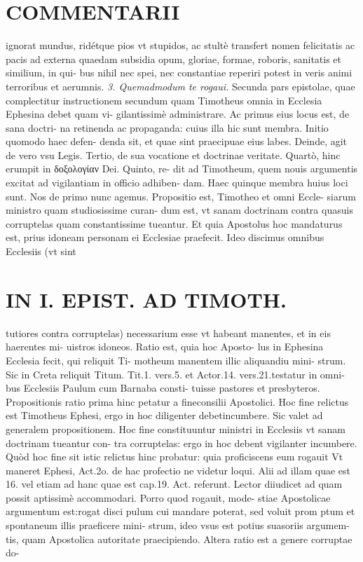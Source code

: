 \documentclass{article}
\begin{document}
\begin{pages}
\section*{COMMENTARII }\pstart ignorat mundus, ridétque pios vt stupidos, ac stultè transfert nomen felicitatis ac pacis ad externa quaedam subsidia opum, gloriae, formae, roboris, sanitatis et similium, in qui- bus nihil nec spei, nec constantiae reperiri potest in veris animi terroribus et aerumnis.  \pend
\textit{3. Quemadmodum te rogaui. }\pstart Secunda pars epistolae, quae complectitur instructionem secundum quam Timotheus omnia in Ecclesia Ephesina debet quam vi- gilantissimè administrare.  \pend\pstart Ac primus eius locus est, de sana doctri- na retinenda ac propaganda: cuius illa hic sunt membra. Initio quomodo haec defen- denda sit, et quae sint praecipuae eius labes. Deinde, agit de vero vsu Legis. Tertio, de sua vocatione et doctrinae veritate. Quartò, hinc erumpit in δοξολογίαν Dei. Quinto, re- dit ad Timotheum, quem nouis argumentis excitat ad vigilantiam in officio adhiben- dam. Haec quinque membra huius loci sunt. Nos de primo nunc agemus.  \pend\pstart Propositio est, Timotheo et omni Eccle- siarum ministro quam studiosissime curan- dum est, vt sanam doctrinam contra quasuis corruptelas quam constantissime tueantur. Et quia Apostolus hoc mandaturus est, prius idoneam personam ei Ecclesiae praefecit. Ideo discimus omnibus Ecclesiis (vt sint  \pend
\section*{IN I. EPIST. AD TIMOTH. }
\marginpar{[ p.17 ]}\pstart tutiores contra corruptelas) necessarium esse vt habeant manentes, et in eis haerentes mi- uistros idoneos. Ratio est, quia hoc Aposto- lus in Ephesina Ecclesia fecit, qui reliquit Ti- motheum manentem illic aliquandiu mini- strum. Sic in Creta reliquit Titum. Tit.1. vers.5. et Actor.14. vers.21.testatur in omni- bus Ecclesiis Paulum cum Barnaba consti- tuisse pastores et presbyteros.  \pend\pstart Propositionis ratio prima hinc petatur a fineconsilii Apostolici. Hoc fine relictus est Timotheus Ephesi, ergo in hoc diligenter debetincumbere. Sic valet ad generalem propositionem. Hoc fine constituuntur ministri in Ecclesiis vt sanam doctrinam tueantur con- tra corruptelas: ergo in hoc debent vigilanter incumbere. Quòd hoc fine sit istic relictus hinc probatur: quia proficiscens eum rogauit Vt maneret Ephesi, Act.2o. de hac profectio ne videtur loqui. Alii ad illam quae est 16. vel etiam ad hanc quae est cap.19. Act. referunt. Lector diiudicet ad quam possit aptissimè accommodari. Porro quod rogauit, mode- stiae Apostolicae argumentum est:rogat disci pulum cui mandare poterat, sed voluit prom ptum et spontaneum illis praeficere mini- strum, ideo vsus est potius suasoriis argumem- tis, quam Apostolica autoritate praecipiendo. Altera ratio est a genere corruptae do-  \pend

\end{pages}
\end{document}
